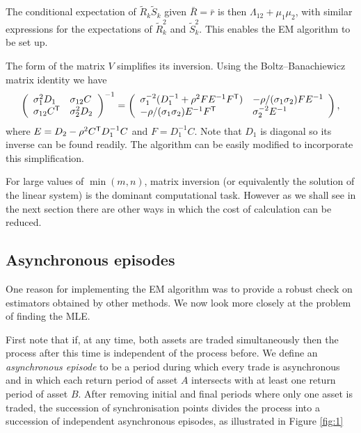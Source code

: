 The conditional expectation of $\tilde{R}_k \tilde{S}_k$ given $\bar{R}=\bar{r}$ is then $\Lambda_{12}+ \mu_1 \mu_2$, with similar expressions for the expectations of  $\tilde{R}_k^2$ and $\tilde{S}_k^2$.  This enables the EM algorithm to be set up.  

The form of the matrix $V$ simplifies its inversion. Using the Boltz--Banachiewicz matrix identity \citep{puntanen2005historical} we have
\begin{equation}\label{matrix}
\left(\begin{array}{ll} \sigma^2_1 D_1 & \sigma_{12} C \\ \sigma_{12} C^{\sf T} & \sigma^2_2 D_2 \end{array} \right)^{-1}
= \left(\begin{array}{ll} \sigma_{1}^{-2} (D^{-1}_1+\rho^2 F E^{-1} F^{\sf T}) & -\rho/(\sigma_{1} \sigma_{2})F E^{-1} \\ -\rho/(\sigma_{1} \sigma_{2})E^{-1} F^{\sf T}  & \sigma_{2}^{-2} E^{-1} \end{array} \right),
\end{equation}
where $E = D_2 - \rho^2 C^{\sf T} D^{-1}_1 C$ and $F= D_1^{-1} C$.  Note that $D_1$ is diagonal so its inverse can be found readily. 
The algorithm can be easily modified to incorporate this simplification. 

For large values of $\min(m,n)$, matrix inversion (or equivalently the solution of the linear system) is the dominant computational task. However as we shall see in the next section there are other ways in which the cost of calculation can be reduced.  

\subsection{Asynchronous episodes}\label{partitioning}
One reason for implementing the EM algorithm was to provide a robust check on estimators obtained by other methods.  We now look more closely at the problem of finding the MLE.  

First note that if, at any time, both assets are traded simultaneously then the process after this time is independent of the  process before.  We define an {\em asynchronous episode} to be a period during which every trade is asynchronous and in which each return period of asset $A$ intersects with at least one return period of asset $B$.  After removing initial and final periods where only one asset is traded, the succession of synchronisation points divides the process into a succession of independent asynchronous episodes, as illustrated in Figure \ref{fig:1}

